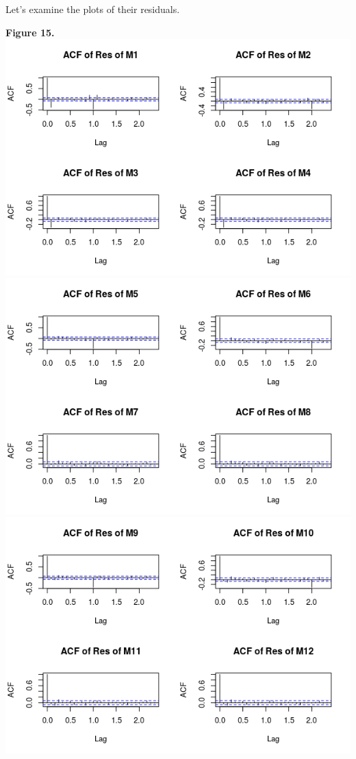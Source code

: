 \documentclass[11pt]{article}
\begin{document}
Let's examine the plots of their residuals.
\begin{center}
\textbf{Figure 15.}
\\
\includegraphics[scale=1]{sar1}
\includegraphics[scale=1]{sar2}
\includegraphics[scale=1]{sar3}

\end{center}
\end{document}
